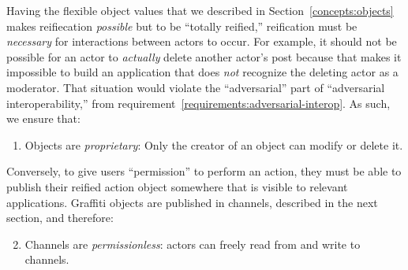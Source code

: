

Having the flexible object values that we described in Section~\ref{concepts:objects}
makes reifiecation \emph{possible} but to be ``totally reified,''
reification must be \emph{necessary} for interactions between
actors to occur.
For example, it should not be possible for an actor to \emph{actually}
delete another actor's post because that makes it impossible to build
an application that does \emph{not} recognize the deleting actor as a moderator.
That situation would violate the ``adversarial'' part of ``adversarial interoperability,''
from requirement~\ref{requirements:adversarial-interop}.
As such, we ensure that:
\begin{enumerate}
\item
Objects are \emph{proprietary}: Only the creator of an object can modify or delete it.
\end{enumerate}
Conversely, to give users ``permission'' to perform an action,
they must be able to publish
their reified action object somewhere that is visible
to relevant applications.
Graffiti objects are published in channels, described in the next
section, and therefore:
\begin{enumerate}
\setcounter{enumi}{1}
\item
Channels are \emph{permissionless}: actors can freely read from and write to channels.
\end{enumerate}

